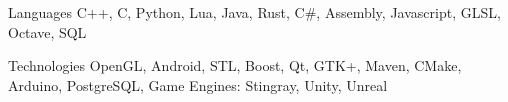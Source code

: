 


\begin{cvskills}


\cvskill
{Languages} %
{C++, C, Python, Lua, Java, Rust, C\#, Assembly, Javascript, GLSL, Octave, SQL } %


\cvskill
{Technologies}
    {OpenGL, Android, STL, Boost, Qt, GTK+, Maven, CMake, Arduino, PostgreSQL, Game Engines: Stingray, Unity, Unreal}



\end{cvskills}
